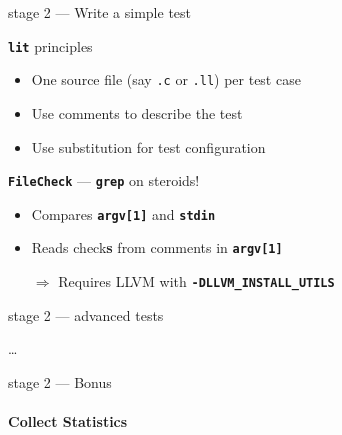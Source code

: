 \documentclass[14pt]{beamer}
\newcommand{\Command}[1]{\textbf{\texttt{#1}}}
\newcommand{\Code}[1]{\textbf{\texttt{#1}}}
\begin{document}
    \begin{frame}{stage 2 --- Write a simple test}
        \begin{alertblock}{\Command{lit} principles}
            \begin{itemize}
                \item One source file (say \texttt{.c} or \texttt{.ll}) per test case
                \item Use comments to describe the test
                \item Use substitution for test configuration
            \end{itemize}
        \end{alertblock}

        \begin{block}{\Command{FileCheck} --- \Command{grep} on steroids!}
            \begin{itemize}
                \item Compares \Code{argv[1]} and \Code{stdin}
                \item Reads check\textbf{s} from comments in \Code{argv[1]}
                \item[$\Rightarrow$] Requires LLVM with \Code{-DLLVM\_INSTALL\_UTILS}
            \end{itemize}
        \end{block}
    \end{frame}

    \begin{frame}[containsverbatim]{stage 2 --- advanced tests}
    \begin{minipage}{\textwidth}
            \footnotesize
            
            \dots
            
        \end{minipage}
    \end{frame}


    \begin{frame}[containsverbatim]{stage 2 --- Bonus}
        \framesubtitle{Collect Statistics}
        {
        \footnotesize
        
        }
        \vspace{-1em}%
        \hspace{-5.5em}%
        \begin{minipage}{\textwidth}
            \footnotesize
            
        \end{minipage}

        {
        \footnotesize
\begin{lstlisting}[language=bash]
% opt -load LLVMMBA.so -mba -stats ...
\end{lstlisting}
        }
    \end{frame}
\end{document}
